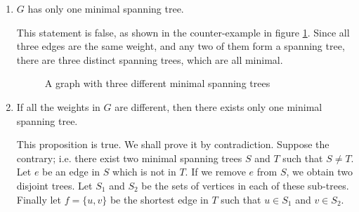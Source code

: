 \documentclass{article}
\begin{document}
\begin{enumerate}
	\item
		\(G\) has only one minimal spanning tree.

		This statement is false, as shown in the counter-example in figure \ref{q4a-counter}. Since all three edges are the same weight, and any two of them form a spanning tree, there are three distinct spanning trees, which are all minimal.
		\begin{figure}[htbp]
			\centering
			\caption{A graph with three different minimal spanning trees}
			\label{q4a-counter}
		\end{figure}

	\item
		If all the weights in \(G\) are different, then there exists only one minimal spanning tree.

		This proposition is true. We shall prove it by contradiction. Suppose the contrary; i.e. there exist two minimal spanning trees \(S\) and \(T\) such that \(S \neq T\). Let \(e\) be an edge in \(S\) which is not in \(T\). If we remove \(e\) from \(S\), we obtain two disjoint trees. Let \(S_1\) and \(S_2\) be the sets of vertices in each of these sub-trees. Finally let \(f = \{u, v\}\) be the shortest edge in \(T\) such that \(u \in S_1\) and \(v \in S_2\).
\end{enumerate}
\end{document}
